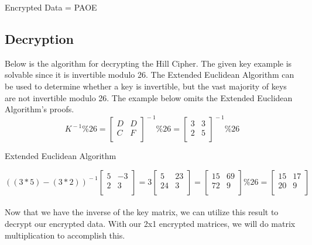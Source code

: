 \documentclass{article}
\begin{document}
  \begin{center}
  \blindtext 
   Encrypted Data = PAOE
\end{center}
 
  
\subsection*{Decryption}
Below is the algorithm for decrypting the Hill Cipher. The given key example is solvable since it is invertible modulo 26. The Extended Euclidean Algorithm can be used to determine whether a key is invertible, but the vast majority of keys are not invertible modulo 26. The example below omits the Extended Euclidean Algorithm's proofs.
  \[K^{\!-1} \% 26=
  \begin{bmatrix}
  D& D\\
    C& F\\
  \end{bmatrix}^{\!-1}\%26=
  \begin{bmatrix}
   3& 3\\
    2& 5\\
  \end{bmatrix}^{\!-1}\%26\]
 \begin{center}
     Extended Euclidean Algorithm
 \end{center}
  \[
    ((3*5)-(3*2))^{\!-1}
    \begin{bmatrix}
   5& -3\\
    2& 3\\
  \end{bmatrix}=
  3 \begin{bmatrix}
   5& 23\\
    24& 3\\
  \end{bmatrix} =
  \begin{bmatrix}
   15& 69\\
    72& 9\\
  \end{bmatrix} \% 26 =
  \begin{bmatrix}
   15& 17\\
    20 & 9\\
  \end{bmatrix}\]
\\
  Now that we have the inverse of the key matrix, we can utilize this result to decrypt our encrypted data. With our 2x1 encrypted matrices, we will do matrix multiplication to accomplish this.
\\ 
\end{document}
